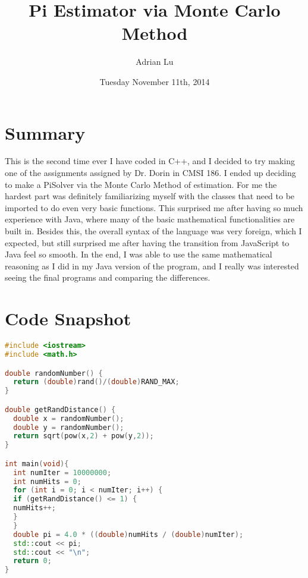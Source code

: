 \documentclass[a4paper]{article}
\title{Pi Estimator via Monte Carlo Method}
\author{Adrian Lu}
\date{Tuesday November 11th, 2014}
\begin{document}
\maketitle

\section{Summary}

This is the second time ever I have coded in C++, and I decided to try making one of the assignments assigned by Dr. Dorin in CMSI 186. I ended up deciding to make a PiSolver via the Monte Carlo Method of estimation. For me the hardest part was definitely familiarizing myself with the classes that need to be imported to do even very basic functions. This surprised me after having so much experience with Java, where many of the basic mathematical functionalities are built in. Besides this, the overall syntax of the language was very foreign, which I expected, but still surprised me after having the transition from JavaScript to Java feel so smooth. In the end, I was able to use the same mathematical reasoning as I did in my Java version of the program, and I really was interested seeing the final programs and comparing the differences.

\section{Code Snapshot}

\begin{lstlisting}[language=C++, caption={C++ code using listings}]
#include <iostream>
#include <math.h>

double randomNumber() {
  return (double)rand()/(double)RAND_MAX;
}

double getRandDistance() {
  double x = randomNumber();
  double y = randomNumber();
  return sqrt(pow(x,2) + pow(y,2));
}

int main(void){
  int numIter = 10000000;
  int numHits = 0;
  for (int i = 0; i < numIter; i++) {
  if (getRandDistance() <= 1) {
  numHits++;
  }
  }
  double pi = 4.0 * ((double)numHits / (double)numIter);
  std::cout << pi;
  std::cout << "\n";
  return 0;
}
\end{lstlisting}
\end{document}
